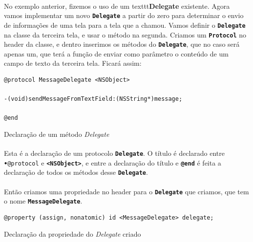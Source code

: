 \documentclass[a4paper,12pt,brazil,doubleside]{book}
\begin{document}
\begin{singlespace}
\paragraph{}No exemplo anterior, fizemos o uso de um texttt{\textbf{Delegate}} existente. Agora vamos implementar um novo \texttt{\textbf{Delegate}} a partir do zero para determinar o envio de informações de uma tela para a tela que a chamou. Vamos definir o \texttt{\textbf{Delegate}} na classe da terceira tela, e usar o método na segunda. Criamos um \texttt{\textbf{Protocol}} no header da classe, e dentro inserimos os métodos do \texttt{\textbf{Delegate}}, que no caso será apenas um, que terá a função de enviar como parâmetro o conteúdo de um campo de texto da terceira tela. Ficará assim:

\begin{listing}[H]
\begin{verbatim}
@protocol MessageDelegate <NSObject>

-(void)sendMessageFromTextField:(NSString*)message;

@end
\end{verbatim}
\caption{Declaração de um método \emph{Delegate}}
\end{listing}

\paragraph{}Esta é a declaração de um protocolo \texttt{\textbf{Delegate}}. O título é declarado entre \texttt{\textbf{•}{@protocol}} e \texttt{\textbf{<NSObject>}}, e entre a declaração do título e \texttt{\textbf{@end}} é feita a declaração de todos os métodos desse \texttt{\textbf{Delegate}}.
\paragraph{}Então criamos uma propriedade no header para o \texttt{\textbf{Delegate}} que criamos, que tem o nome \texttt{\textbf{MessageDelegate}}.

\begin{listing}[H]
\begin{verbatim}
@property (assign, nonatomic) id <MessageDelegate> delegate;
\end{verbatim}
\caption{Declaração da propriedade do \emph{Delegate} criado}
\end{listing}


\end{singlespace}
\end{document}

